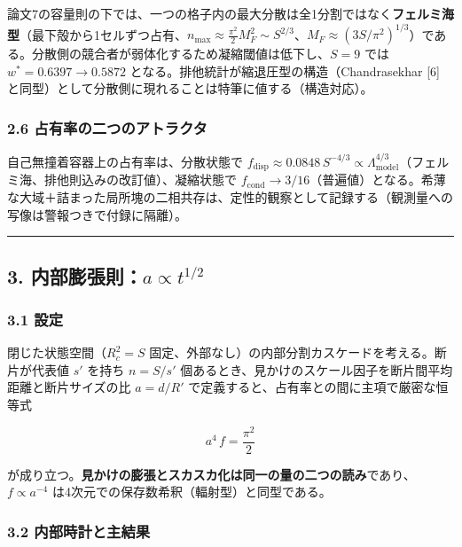 \documentclass[
]{ltjsarticle}
\begin{document}
論文7の容量則の下では、一つの格子内の最大分散は全1分割ではなく\textbf{フェルミ海型}（最下殻から1セルずつ占有、\(n_{\max}\approx\tfrac{\pi^2}2 M_F^2\sim S^{2/3}\)、\(M_F\approx(3S/\pi^2)^{1/3}\)）である。分散側の競合者が弱体化するため凝縮閾値は低下し、\(S=9\)
では \(w^*=0.6397\to0.5872\)
となる。排他統計が縮退圧型の構造（Chandrasekhar {[}6{]}
と同型）として分散側に現れることは特筆に値する（構造対応）。

\subsubsection{2.6
占有率の二つのアトラクタ}\label{ux5360ux6709ux7387ux306eux4e8cux3064ux306eux30a2ux30c8ux30e9ux30afux30bf}

自己無撞着容器上の占有率は、分散状態で
\(f_{\mathrm{disp}}\approx0.0848\,S^{-4/3}\propto\Lambda_{\mathrm{model}}^{4/3}\)（フェルミ海、排他則込みの改訂値）、凝縮状態で
\(f_{\mathrm{cond}}\to3/16\)（普遍値）となる。希薄な大域＋詰まった局所塊の二相共存は、定性的観察として記録する（観測量への写像は警報つきで付録に隔離）。

\begin{center}\rule{0.5\linewidth}{0.5pt}\end{center}

\subsection{\texorpdfstring{3.
内部膨張則：\(a\propto t^{1/2}\)}{3. 内部膨張則：a\textbackslash propto t\^{}\{1/2\}}}\label{ux5185ux90e8ux81a8ux5f35ux5247apropto-t12}

\subsubsection{3.1 設定}\label{ux8a2dux5b9a}

閉じた状態空間（\(R_c^2=S\)
固定、外部なし）の内部分割カスケードを考える。断片が代表値 \(s'\) を持ち
\(n=S/s'\)
個あるとき、見かけのスケール因子を断片間平均距離と断片サイズの比
\(a=d/R'\) で定義すると、占有率との間に主項で厳密な恒等式

\[
a^4\,f=\frac{\pi^2}{2}
\]

が成り立つ。\textbf{見かけの膨張とスカスカ化は同一の量の二つの読み}であり、\(f\propto a^{-4}\)
は4次元での保存数希釈（輻射型）と同型である。

\subsubsection{3.2
内部時計と主結果}\label{ux5185ux90e8ux6642ux8a08ux3068ux4e3bux7d50ux679c}
\end{document}
